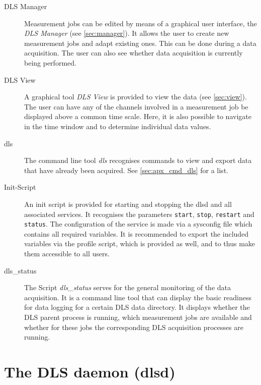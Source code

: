 \documentclass[a4paper,12pt,BCOR6mm,bibtotoc,idxtotoc]{scrbook}
\begin{document}
\begin{description}

\item[DLS Manager] Measurement jobs
can be edited by means of a graphical user interface, the \textit{DLS Manager}
(see \autoref{sec:manager}). It allows the user to create new measurement jobs
and adapt existing ones. This can be done during a data acquisition. The user
can also see whether data acquisition is currently being performed.

\item[DLS View] A graphical tool \textit{DLS View} is provided
to view the data (see \autoref{sec:view}). The user can have any of the
channels involved in a measurement job be displayed above a common time scale.
Here, it is also possible to navigate in the time window and to determine
individual data values.

\item[dls] The command line tool \textit{dls} recognises
commands to view and export data that have already been acquired. See
\autoref{sec:apx_cmd_dls} for a list.

\item[Init-Script] An init script is provided for starting
and stopping the dlsd and all associated services. It recognises the
parameters \texttt{start}, \texttt{stop}, \texttt{restart} and
\texttt{status}. The configuration of the service is made via a sysconfig
file which contains all required variables. It is
recommended to export the included variables via the profile script, which is
provided as well, and to thus make them accessible to all users.

\item[dls\_status] The Script \textit{dls\_\-status} serves
for the general monitoring of the data acquisition. It is a command line tool
that can display the basic readiness for data logging for a certain DLS data
directory. It displays whether the DLS parent process is running, which
measurement jobs are available and whether for these jobs the corresponding
DLS acquisition processes are running.

\end{description}


\chapter{The DLS daemon (dlsd)} \label{sec:dlsd}
\end{document}
